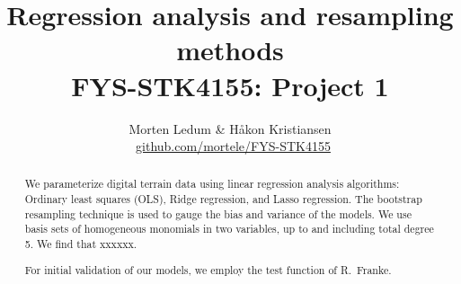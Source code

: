\documentclass[a4paper]{article}
\title{{\sc Regression analysis and resampling methods \\ {\large FYS-STK4155: Project 1}}}
\author{Morten Ledum \& Håkon Kristiansen \\ \faGithub \ {\small \url{github.com/mortele/FYS-STK4155}}}
\begin{document}
\maketitle
\begin{abstract}
We parameterize digital terrain data using linear regression analysis algorithms: Ordinary least squares (OLS), Ridge regression, and Lasso regression. The bootstrap resampling technique is used to gauge the bias and variance of the models. We use basis sets of homogeneous monomials in two variables, up to and including total degree 5. We find that xxxxxx.

For initial validation of our models, we employ the test function of R.\ Franke\autocite{franke1979critical}.
\end{abstract}

\tableofcontents 
\newpage
\end{document}
